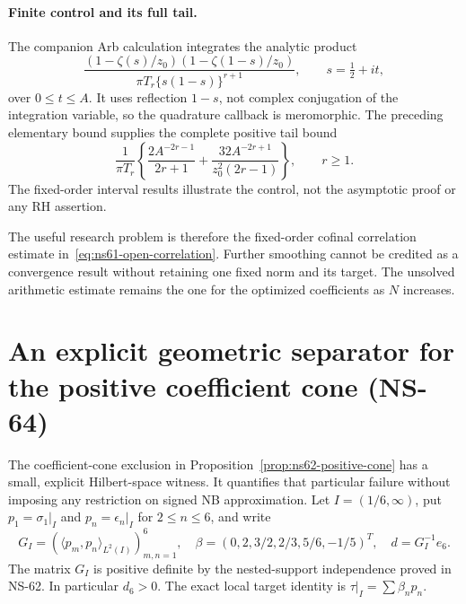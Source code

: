 \paragraph{Finite control and its full tail.}
The companion Arb calculation integrates the analytic product
\[
 \frac{(1-\zeta(s)/z_0)(1-\zeta(1-s)/z_0)}
             {\pi T_r\{s(1-s)\}^{r+1}},\qquad s=\tfrac12+it,
\]
over $0\leq t\leq A$. It uses reflection $1-s$, not complex
conjugation of the integration variable, so the quadrature callback
is meromorphic. The preceding elementary bound supplies the complete
positive tail bound
\begin{equation}
 \frac1{\pi T_r}\left\{
       \frac{2A^{-2r-1}}{2r+1}
       +\frac{32A^{-2r+1}}{z_0^2(2r-1)}\right\},\qquad r\geq1.
 \label{eq:ns63-quadrature-tail}
\end{equation}
The fixed-order interval results illustrate the control, not the
asymptotic proof or any RH assertion.

The useful research problem is therefore the fixed-order cofinal
correlation estimate in~\eqref{eq:ns61-open-correlation}. Further
smoothing cannot be credited as a convergence result without retaining
one fixed norm and its target. The unsolved arithmetic estimate remains
the one for the optimized coefficients as $N$ increases.

\section{An explicit geometric separator for the positive coefficient cone (NS-64)}
\label{sec:ns64-cone-separator}

The coefficient-cone exclusion in Proposition~\ref{prop:ns62-positive-cone}
has a small, explicit Hilbert-space witness. It quantifies that particular
failure without imposing any restriction on signed NB approximation.
Let $I=(1/6,\infty)$, put $p_1=\sigma_1|_I$ and
$p_n=\epsilon_n|_I$ for $2\leq n\leq6$, and write
\[
 G_I=(\langle p_m,p_n\rangle_{L^2(I)})_{m,n=1}^6,\quad
 \beta=(0,2,3/2,2/3,5/6,-1/5)^T,\quad
 d=G_I^{-1}e_6.
\]
The matrix $G_I$ is positive definite by the nested-support independence
proved in NS-62. In particular $d_6>0$.
The exact local target identity is $\tau|_I=\sum\beta_np_n$.

